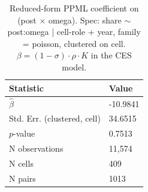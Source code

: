 \begin{table}[ht]
\centering
\caption{Reduced-form PPML coefficient on (post $\times$ omega).  Spec: share $\sim$ post:omega | cell-role + year, family = poisson, clustered on cell. $\beta = (1 - \sigma) \cdot \rho \cdot K$ in the CES model.} 
\label{tab:phase4_within_intensive_ces_ppml_beta}
\begin{tabular}{ll}
  \toprule
Statistic & Value \\ 
  \midrule
$\widehat{\beta}$ & -10.9841 \\ 
  Std. Err. (clustered, cell) & 34.6515 \\ 
  $p$-value & 0.7513 \\ 
  N observations & 11,574 \\ 
  N cells & 409 \\ 
  N pairs & 1013 \\ 
   \bottomrule
\end{tabular}
\end{table}
